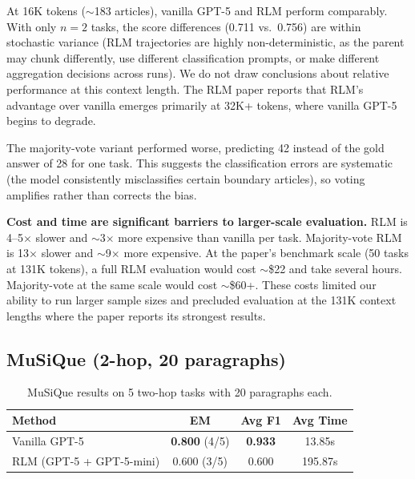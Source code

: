 \documentclass[11pt]{article}
\begin{document}
At 16K tokens ($\sim$183 articles), vanilla GPT-5 and RLM perform comparably. With only $n=2$ tasks, the score differences (0.711 vs.\ 0.756) are within stochastic variance (RLM trajectories are highly non-deterministic, as the parent may chunk differently, use different classification prompts, or make different aggregation decisions across runs). We do not draw conclusions about relative performance at this context length. The RLM paper reports that RLM's advantage over vanilla emerges primarily at 32K+ tokens, where vanilla GPT-5 begins to degrade.

The majority-vote variant performed worse, predicting 42 instead of the gold answer of 28 for one task. This suggests the classification errors are systematic (the model consistently misclassifies certain boundary articles), so voting amplifies rather than corrects the bias.

\textbf{Cost and time are significant barriers to larger-scale evaluation.} RLM is 4--5$\times$ slower and $\sim$3$\times$ more expensive than vanilla per task. Majority-vote RLM is 13$\times$ slower and $\sim$9$\times$ more expensive. At the paper's benchmark scale (50 tasks at 131K tokens), a full RLM evaluation would cost $\sim$\$22 and take several hours. Majority-vote at the same scale would cost $\sim$\$60+. These costs limited our ability to run larger sample sizes and precluded evaluation at the 131K context lengths where the paper reports its strongest results.

\subsection{MuSiQue (2-hop, 20 paragraphs)}

\begin{table}[h]
\centering
\begin{tabular}{lccc}
\toprule
\textbf{Method} & \textbf{EM} & \textbf{Avg F1} & \textbf{Avg Time} \\
\midrule
Vanilla GPT-5 & \textbf{0.800} (4/5) & \textbf{0.933} & 13.85s \\
RLM (GPT-5 + GPT-5-mini) & 0.600 (3/5) & 0.600 & 195.87s \\
\bottomrule
\end{tabular}
\caption{MuSiQue results on 5 two-hop tasks with 20 paragraphs each.}
\label{tab:musique}
\end{table}
\end{document}
